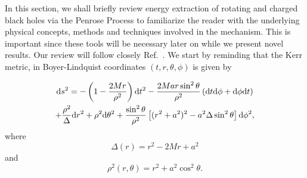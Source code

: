 In this section, we shall briefly review energy extraction of rotating and charged black holes via the Penrose Process to familiarize the reader with the underlying physical concepts, methods and techniques involved in the mechanism. This is important since these tools will be necessary later on while we present novel results. Our review will follow closely Ref.~\cite{carroll}. We start by reminding that the Kerr metric, in Boyer-Lindquist coordinates $(t, r, \theta, \phi)$ is given by

\begin{multline}
  \mathrm{d} s^2 = -\left(1 - \frac{2 M r}{\rho^2}\right)\mathrm{d} t^2 - \frac{2 M a r \sin^2\theta}{\rho^2}\left( \mathrm{d} t \mathrm{d} \phi + \mathrm{d} \phi \mathrm{d} t \right)\\
  + \frac{\rho^2}{\Delta} \mathrm{d} r^2 + \rho^2 \mathrm{d}\theta^2 + \frac{\sin^2\theta}{\rho^2}\left[ (r^2 + a^2)^2 - a^2\Delta\sin^2\theta \right]\mathrm{d}\phi^2,
  \label{eq:kerr_penrose_review_kerr_metric}
\end{multline}
%
where
%
\begin{equation}
  \Delta(r) = r^2 - 2Mr + a^2
  \label{eq:kerr_penrose_review_kerr_delta}
\end{equation}
%
and
%
\begin{equation}
  \rho^2(r, \theta) = r^2 + a^2\cos^2\theta.
  \label{eq:kerr_penrose_review_kerr_rho}
\end{equation}

